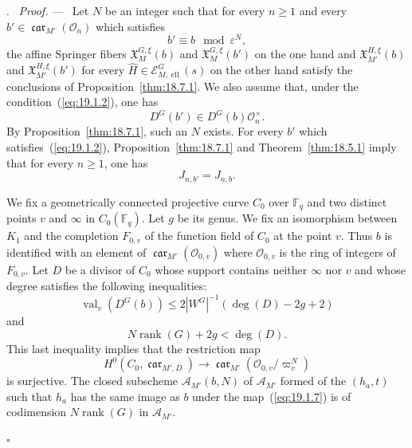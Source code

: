 \documentclass[12pt,a4paper,oneside,english,leqno]{smfart}
\makeatletter
\numberwithin{equation}{subsection}
\numberwithin{theo}{subsection}
\newenvironment{paragr}[1][]{\medskip\refstepcounter{subsection}%
  \par\noindent\hspace*{\parindent}\thesubsection.\ \emph{#1}%
  \@ifundefined{@empty}{}{}\ignorespaces}{\medskip}
\theoremstyle{plain}
\theoremstyle{definition}
\theoremstyle{remark}
\newenvironment{preuve}[1][]{\medskip\noindent\textit{Proof.} #1 ---\ }%
  {\hfill\ensuremath{\square}\medskip}
\DeclareMathOperator{\rang}{rank}
\DeclareMathOperator{\el}{ell}
\DeclareMathOperator{\val}{val}
\DeclareMathOperator{\car}{\mathfrak{car}}
\newcommand{\Fq}{\mathbb{F}_q}
\newcommand{\oc}{\mathcal{O}}
\newcommand{\ec}{\mathcal{E}}
\newcommand{\Ac}{\mathcal{A}}
\newcommand{\Hc}{\widehat{H}}
\newcommand{\Xgo}{\mathfrak{X}}
\newcommand{\eps}{\varepsilon}
\renewcommand{\leq}{\leqslant}
\renewcommand{\geq}{\geqslant}
\makeatother
\begin{document}
\begin{paragr}
\begin{preuve}
Let $N$ be an integer such that for every $n\geq 1$ and every $b'\in\car_{M'}(\oc_n)$ which satisfies
\begin{equation}\label{eq:19.1.2}
b'\equiv b \mod \eps^N,
\end{equation}
the affine Springer fibers $\Xgo^{G,\xi}_M(b)$ and $\Xgo^{G,\xi}_M(b')$ on the one hand and $\Xgo^{H,\xi}_{M'}(b)$ and $\Xgo^{H,\xi}_{M'}(b')$ for every $\Hc\in\ec^G_{M,\el}(s)$ on the other hand satisfy the conclusions of Proposition~\ref{thm:18.7.1}. We also assume that, under the condition~(\ref{eq:19.1.2}), one has
\begin{equation}\label{eq:19.1.3}
D^G(b')\in D^G(b)\oc_n^\times.
\end{equation}
By Proposition~\ref{thm:18.7.1}, such an $N$ exists. For every $b'$ which satisfies~(\ref{eq:19.1.2}), Proposition~\ref{thm:18.7.1} and Theorem~\ref{thm:18.5.1} imply that for every $n\geq 1$, one has
\begin{equation}\label{eq:19.1.4}
J_{n,b'}=J_{n,b}.
\end{equation}

We fix a geometrically connected projective curve $C_0$ over $\Fq$ and two distinct points $v$ and $\infty$ in $C_0(\Fq)$. Let $g$ be its genus. We fix an isomorphism between $K_1$ and the completion $F_{0,v}$ of the function field of $C_0$ at the point $v$. Thus $b$ is identified with an element of $\car_{M'}(\oc_{0,v})$ where $\oc_{0,v}$ is the ring of integers of $F_{0,v}$. Let $D$ be a divisor of $C_0$ whose support contains neither $\infty$ nor $v$ and whose degree satisfies the following inequalities:
\begin{equation}\label{eq:19.1.5}
\val_v(D^G(b))\leq 2|W^G|^{-1}(\deg(D)-2g+2)
\end{equation}
and
\begin{equation}\label{eq:19.1.6}
N\rang(G)+2g<\deg(D).
\end{equation}
This last inequality implies that the restriction map
\begin{equation}\label{eq:19.1.7}
H^0(C_0,\car_{M',D})\to\car_{M'}(\oc_{0,v}/\varpi_v^N)
\end{equation}
is surjective. The closed subscheme $\Ac_{M'}(b,N)$ of $\Ac_{M'}$ formed of the $(h_a,t)$ such that $h_a$ has the same image as $b$ under the map~(\ref{eq:19.1.7}) is of codimension $N\rang(G)$ in $\Ac_{M'}$.


\end{preuve}
\end{paragr}
\end{document}
